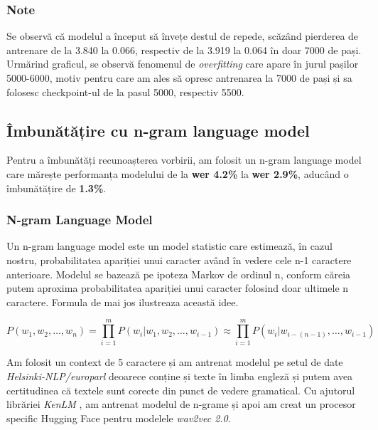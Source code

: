 \subsubsection{Note}
Se observă că modelul a început să învețe destul de repede, scăzând pierderea de antrenare
de la 3.840 la 0.066, respectiv de la 3.919 la 0.064 în doar 7000 de pași. Urmărind graficul,
se observă fenomenul de \textit{overfitting} care apare în jurul pașilor 5000-6000, motiv
pentru care am ales să opresc antrenarea la 7000 de pași și sa folosesc checkpoint-ul de
la pasul 5000, respectiv 5500.




\subsection{Îmbunătățire cu n-gram language model}
Pentru a îmbunătăți recunoașterea vorbirii, am folosit un n-gram language model care 
mărește performanța modelului de la \textbf{wer 4.2\%}  la \textbf{wer 2.9\%}, aducând
o îmbunătățire de \textbf{1.3\%}.

\subsubsection{N-gram Language Model}
Un n-gram language model este un model statistic care estimează, în cazul nostru, probabilitatea
apariției unui caracter având în vedere cele n-1 caractere anterioare. Modelul se bazează pe
ipoteza Markov de ordinul n, conform căreia putem aproxima probabilitatea apariției unui caracter
folosind doar ultimele n caractere. Formula de mai jos ilustreaza această idee.

\begin{equation}
    P(w_1, w_2, \ldots, w_n) = \prod_{i=1}^{m} P(w_i | w_{1}, w_{2}, \ldots, w_{i-1}) \approx \prod_{i=1}^{m} P(w_i | w_{i-(n-1)}, \ldots, w_{i-1})
\end{equation}

\par
Am folosit un context de 5 caractere și am antrenat modelul pe
setul de date \textit{Helsinki-NLP/europarl} \cite{tiedemann-2012-parallel} deoarece conține și
texte în limba engleză și putem avea certitudinea că textele sunt corecte din punct de vedere
gramatical. Cu ajutorul librăriei \textit{KenLM} \cite{heafield-2011-kenlm}, am antrenat modelul
de n-grame și apoi am creat un procesor specific Hugging Face pentru modelele \textit{wav2vec 2.0}.

